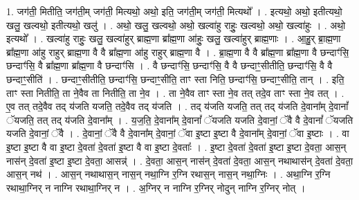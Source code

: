 \documentclass[17pt]{extarticle}
\begin{document}
1. जग॑ती॒ मितीति॒ जग॑ती॒म् जग॑ती॒ मित्यथो॒ अथो॒ इति॒ जग॑ती॒म् जग॑ती॒ मित्यथो᳚ । . इत्यथो॒ अथो॒ इतीत्यथो॒ खलु॒ खल्वथो॒ इतीत्यथो॒ खलु॑ । . अथो॒ खलु॒ खल्वथो॒ अथो॒ खल्वा॑हु राहुः॒ खल्वथो॒ अथो॒ खल्वा॑हुः । . अथो॒ इत्यथो᳚ । . खल्वा॑हु राहुः॒ खलु॒ खल्वा॑हुर् ब्राह्म॒णा ब्रा᳚ह्म॒णा आ॑हुः॒ खलु॒ खल्वा॑हुर् ब्राह्म॒णाः । . आ॒हु॒र् ब्रा॒ह्म॒णा ब्रा᳚ह्म॒णा आ॑हु राहुर् ब्राह्म॒णा वै वै ब्रा᳚ह्म॒णा आ॑हु राहुर् ब्राह्म॒णा वै । . ब्रा॒ह्म॒णा वै वै ब्रा᳚ह्म॒णा ब्रा᳚ह्म॒णा वै छन्दाꣳ॑सि॒ छन्दाꣳ॑सि॒ वै ब्रा᳚ह्म॒णा ब्रा᳚ह्म॒णा वै छन्दाꣳ॑सि । . वै छन्दाꣳ॑सि॒ छन्दाꣳ॑सि॒ वै वै छन्दाꣳ॒॒सीतीति॒ छन्दाꣳ॑सि॒ वै वै छन्दाꣳ॒॒सीति॑ । . छन्दाꣳ॒॒सीतीति॒ छन्दाꣳ॑सि॒ छन्दाꣳ॒॒सीति॒ ताꣳ स्ता निति॒ छन्दाꣳ॑सि॒ छन्दाꣳ॒॒सीति॒ तान् । . इति॒ ताꣳ स्ता नितीति॒ ता ने॒वैव ता नितीति॒ ता ने॒व । . ता ने॒वैव ताꣳ स्ता ने॒व तत् तदे॒व ताꣳ स्ता ने॒व तत् । . ए॒व तत् तदे॒वैव तद् य॑जति यजति॒ तदे॒वैव तद् य॑जति । . तद् य॑जति यजति॒ तत् तद् य॑जति दे॒वाना᳚म् दे॒वानां᳚ ॅयजति॒ तत् तद् य॑जति दे॒वाना᳚म् । . य॒ज॒ति॒ दे॒वाना᳚म् दे॒वानां᳚ ॅयजति यजति दे॒वानां॒ ॅवै वै दे॒वानां᳚ ॅयजति यजति दे॒वानां॒ ॅवै । . दे॒वानां॒ ॅवै वै दे॒वाना᳚म् दे॒वानां॒ ॅवा इ॒ष्टा इ॒ष्टा वै दे॒वाना᳚म् दे॒वानां॒ ॅवा इ॒ष्टाः । . वा इ॒ष्टा इ॒ष्टा वै वा इ॒ष्टा दे॒वता॑ दे॒वता॑ इ॒ष्टा वै वा इ॒ष्टा दे॒वताः᳚ । . इ॒ष्टा दे॒वता॑ दे॒वता॑ इ॒ष्टा इ॒ष्टा दे॒वता॒ आस॒न् नास॑न् दे॒वता॑ इ॒ष्टा इ॒ष्टा दे॒वता॒ आसन्न्॑ । . दे॒वता॒ आस॒न् नास॑न् दे॒वता॑ दे॒वता॒ आस॒न् नथाथास॑न् दे॒वता॑ दे॒वता॒ आस॒न् नथ॑ । . आस॒न् नथाथास॒न् नास॒न् नथा॒ग्नि र॒ग्नि रथास॒न् नास॒न् नथा॒ग्निः । . अथा॒ग्नि र॒ग्नि रथाथा॒ग्निर् न नाग्नि रथाथा॒ग्निर् न । . अ॒ग्निर् न नाग्नि र॒ग्निर् नोदुन् नाग्नि र॒ग्निर् नोत् । \newline
\end{document}

